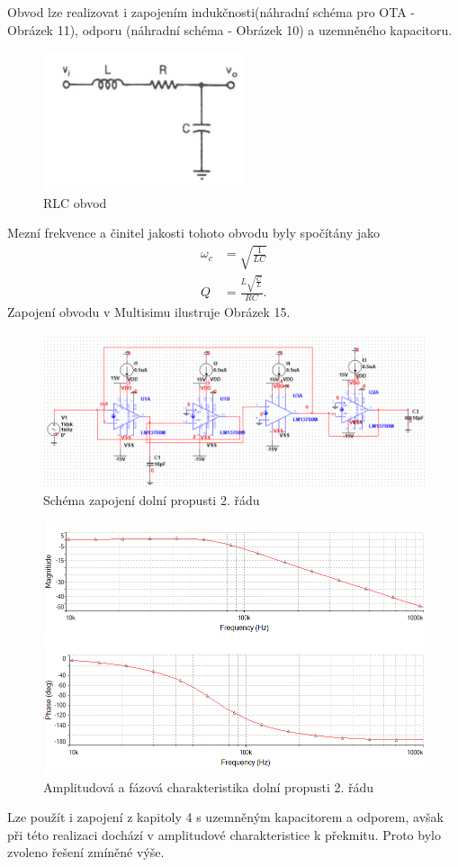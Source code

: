 \documentclass[twoside]{article}
\begin{document}
\noindent Obvod lze realizovat i zapojením indukčnosti(náhradní schéma pro OTA - Obrázek 11), odporu (náhradní schéma - Obrázek 10) a uzemněného kapacitoru. 
\begin{figure}[H]
\centering
\includegraphics[scale=0.8]{171.png}
\caption{RLC obvod \cite{9}}
\end{figure}
\noindent Mezní frekvence a činitel jakosti tohoto obvodu byly spočítány jako 
\begin{align}
\omega _c &= \sqrt{\frac{1}{LC}}\\
Q &= \frac{L\sqrt{\frac{C}{L}}}{RC}.
\end{align}
Zapojení obvodu v Multisimu ilustruje Obrázek 15.
\begin{figure}[H]
\centering
\includegraphics[scale=0.7]{1707.png}
\caption{Schéma zapojení dolní propusti 2. řádu}
\end{figure}
\begin{figure}[H]
\centering
\includegraphics[scale=0.75]{17072.png}
\caption{Amplitudová a fázová charakteristika dolní propusti 2. řádu}
\end{figure}
\noindent Lze použít i zapojení z kapitoly 4 s uzemněným kapacitorem a odporem, avšak při této realizaci dochází v amplitudové charakteristice k překmitu. Proto bylo zvoleno řešení zmíněné výše.
\newpage
\end{document}
